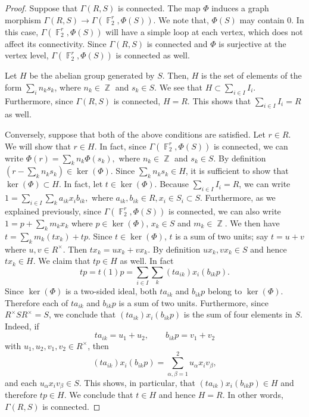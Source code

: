 \documentclass[11pt, a4paper]{amsart}
\theoremstyle{definition}
\DeclareMathOperator{\Z}{\mathbb{Z}}
\DeclareMathOperator{\F}{\mathbb{F}}
\numberwithin{equation}{section}
\begin{document}
\begin{proof}
    Suppose that $\Gamma(R,S)$ is connected. The map $\Phi$ induces a graph morphism $\Gamma(R,S) \to \Gamma(\F_2^r, \Phi(S))$. We note that, $\Phi(S)$ may contain $0$. In this case, $\Gamma(\F_2^r, \Phi(S))$ will have a simple loop at each vertex, which does not affect its connectivity. Since $\Gamma(R,S)$ is connected and $\Phi$ is surjective at the vertex level, $\Gamma(\F_2^r, \Phi(S))$ is connected as well. 
    
    
    Let $H$ be the abelian group generated by $S.$ Then, $H$ is the set of elements of the form $\sum_{i} n_k s_k$, where $n_k \in \Z$ and $s_k \in S.$ We see that $H \subset \sum_{i\in I} I_i.$ Furthermore, since $\Gamma(R,S)$ is connected, $H=R$. This shows that $\sum_{i \in I} I_i =R$ as well. 


Conversely, suppose that both of the above conditions are satisfied. Let $r \in R.$ We will show that $r \in H.$ In fact, since $\Gamma(\F_2^r, \Phi(S))$ is connected, we can write $\Phi(r) = \sum_{k} n_k \Phi(s_k),$ where $n_k \in \Z$ and $s_k \in S.$ By definition $(r-\sum_{k} n_ks_k) \in \ker(\Phi).$ Since $\sum_{k} n_k s_k \in H$, it is sufficient to show that $\ker(\Phi) \subset H.$ In fact, let $t \in \ker(\Phi)$. Because $\sum_{i \in I} I_i=R$, we can write  $1 = \sum_{i \in I} \sum_{k} a_{ik} x_i b_{ik},$ where $a_{ik}, b_{ik}  \in R, x_i \in S_i \subset S.$ Furthermore, as we explained previously, since $\Gamma(\F_2^r, \Phi(S))$ is connected, we can also write $1 = p+ \sum_{k} m_k x_k $ where $p \in \ker(\Phi)$, $x_k \in S$ and $m_k \in \Z.$ We then have  $t = \sum_{k} m_k (t x_k) + tp.$
 Since $t \in \ker(\Phi)$, $t$ is a sum of two units; say $t=u+v$ where $u,v \in R^{\times}.$ Then 
 $ tx_k = ux_k +v x_k.$  By definition $ux_k, vx_k \in S$ and hence $tx_k \in H.$ We claim that $tp \in H$ as well. In fact 
\[ tp = t(1)p = \sum_{i \in I} \sum_{k} (ta_{ik}) x_i (b_{ik}p). \]
Since \(\ker(\Phi)\) is a two-sided ideal, both \(ta_{ik}\) and \(b_{ik}p\) belong to \(\ker(\Phi)\). Therefore each of $ta_{ik}$ and $b_{ik}p$ is a sum of two units. Furthermore, since $R^{\times} S R^{\times}=S$, we conclude that $(ta_{ik}) x_i (b_{ik}p)$ is the sum of four elements in $S.$ Indeed, if
\[
ta_{ik}=u_1+u_2,\qquad b_{ik}p=v_1+v_2
\]
with \(u_1,u_2,v_1,v_2\in R^\times\), then
\[
(ta_{ik})x_i(b_{ik}p)
=
\sum_{\alpha,\beta=1}^2 u_\alpha x_i v_\beta,
\]
and each \(u_\alpha x_i v_\beta\in S\). This shows, in particular,  that $(ta_{ik}) x_i (b_{ik}p) \in H$ and therefore $tp \in H$. We conclude that $t \in H$ and hence $H=R.$ In other words, $\Gamma(R,S)$ is connected.  
\end{proof}
\end{document}
